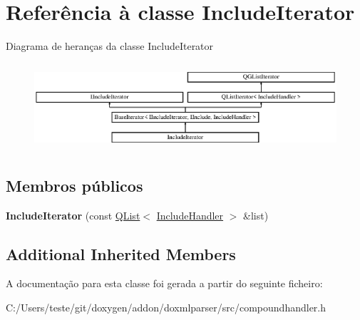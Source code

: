 \hypertarget{class_include_iterator}{\section{Referência à classe Include\-Iterator}
\label{class_include_iterator}
}
Diagrama de heranças da classe Include\-Iterator\begin{figure}[H]
\begin{center}
\leavevmode
\includegraphics[height=3.255814cm]{class_include_iterator}
\end{center}
\end{figure}
\subsection*{Membros públicos}
\begin{DoxyCompactItemize}
\item 
\hypertarget{class_include_iterator_a819b91bc41d55f06ee0a18f15d3f2821}{{\bfseries Include\-Iterator} (const \hyperlink{class_q_list}{Q\-List}$<$ \hyperlink{class_include_handler}{Include\-Handler} $>$ \&list)}\label{class_include_iterator_a819b91bc41d55f06ee0a18f15d3f2821}

\end{DoxyCompactItemize}
\subsection*{Additional Inherited Members}


A documentação para esta classe foi gerada a partir do seguinte ficheiro\-:\begin{DoxyCompactItemize}
\item 
C\-:/\-Users/teste/git/doxygen/addon/doxmlparser/src/compoundhandler.\-h\end{DoxyCompactItemize}
